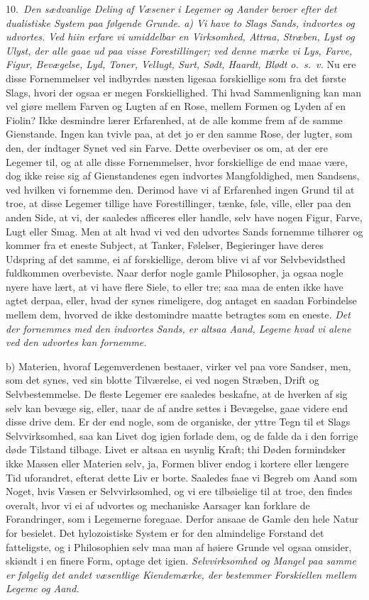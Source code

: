 \documentclass[12pt,a4paper]{article}
\newcommand{\opage}[1]{\marginnote{\footnotesize\textit{[#1]}}}
\begin{document}
10.~\emph{Den sædvanlige Deling af Væsener i Legemer og Aander beroer efter det
dualistiske System paa følgende Grunde. a) Vi have to Slags Sands, indvortes og
udvortes.}
\opage{19} \emph{Ved hiin erfare vi umiddelbar en Virksomhed, Attraa, Stræben, Lyst og
Ulyst, der alle gaae ud paa visse Forestillinger; ved denne mærke vi Lys, Farve,
Figur, Bevægelse, Lyd, Toner, Vellugt, Surt, Sødt, Haardt, Blødt o.~s.~v.} Nu ere
disse Fornemmelser vel indbyrdes næsten ligesaa forskiellige som fra det første
Slags, hvori der ogsaa er megen Forskiellighed. Thi hvad Sammenligning kan man
vel giøre mellem Farven og Lugten af en Rose, mellem Formen og Lyden af en
Fiolin? Ikke desmindre lærer Erfarenhed, at de alle komme frem af de samme
Gienstande. Ingen kan tvivle paa, at det jo er den samme Rose, der lugter, som
den, der indtager Synet ved sin Farve. Dette overbeviser os om, at der ere
Legemer til, og at alle disse Fornemmelser, hvor forskiellige de end maae være,
dog ikke reise sig af Gienstandenes egen indvortes Mangfoldighed, men Sandsens,
ved hvilken vi fornemme den. Derimod have vi af Erfarenhed ingen Grund til at
troe, at disse Legemer tillige have Forestillinger, tænke, føle, ville, eller paa
den anden Side, at vi, der saaledes afficeres eller handle, selv have nogen
Figur, Farve, Lugt eller Smag. Men at alt hvad vi ved den udvortes Sands
fornemme tilhører og kommer fra et eneste Subject, at Tanker, Følelser,
Begieringer have deres Udspring af det samme, ei af forskiellige, derom blive vi
af vor Selvbevidsthed fuldkommen overbeviste. Naar derfor nogle gamle
Philosopher, ja ogsaa nogle nyere
\opage{20} have lært, at vi have flere Siele, to eller tre; saa maa de enten ikke have agtet
derpaa, eller, hvad der synes rimeligere, dog antaget en saadan Forbindelse
mellem dem, hvorved de ikke destomindre maatte betragtes som en eneste.
\emph{Det der fornemmes med den indvortes Sands, er altsaa Aand, Legeme hvad vi
alene ved den udvortes kan fornemme.}

b) Materien, hvoraf Legemverdenen bestaaer, virker vel paa vore Sandser, men, som
det synes, ved sin blotte Tilværelse, ei ved nogen Stræben, Drift og
Selvbestemmelse. De fleste Legemer ere saaledes beskafne, at de hverken af sig
selv kan bevæge sig, eller, naar de af andre settes i Bevægelse, gaae videre end
disse drive dem. Er der end nogle, som de organiske, der yttre Tegn til et Slags
Selvvirksomhed, saa kan Livet dog igien forlade dem, og de falde da i den forrige
døde Tilstand tilbage. Livet er altsaa en usynlig Kraft; thi Døden formindsker
ikke Massen eller Materien selv, ja, Formen bliver endog i kortere eller længere
Tid uforandret, efterat dette Liv er borte. Saaledes faae vi Begreb om Aand som
Noget, hvis Væsen er Selvvirksomhed, og vi ere tilbøielige til at troe, den
findes overalt, hvor vi ei af udvortes og mechaniske Aarsager kan forklare de
Forandringer, som i Legemerne foregaae. Derfor ansaae de Gamle den hele Natur for
besielet. Det hylozoistiske System er for den almindelige Forstand det
\opage{21} fatteligste, og i Philosophien selv maa man af høiere Grunde vel ogsaa omsider,
skiøndt i en finere Form, optage det igien. \emph{Selvvirksomhed og Mangel paa
samme er følgelig det andet væsentlige Kiendemærke, der bestemmer Forskiellen
mellem Legeme og Aand.}
\end{document}
